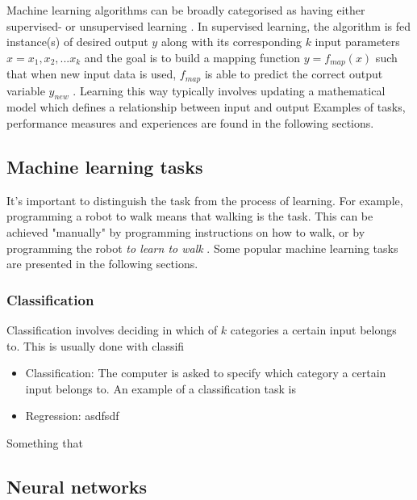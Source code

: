 
	Machine learning algorithms can be broadly categorised as having either supervised- or unsupervised learning \cite{BOOK:1}. In supervised learning, the algorithm is fed instance(s) of desired output $y$ along with its corresponding $k$ input parameters $x = {x_1, x_2, ... x_k}$ and the goal is to build a mapping function $y = f_{map}(x)$ such that when new input data is used, $f_{map}$ is able to predict the correct output variable $y_{new}$ \cite{WEBSITE:3}. Learning this way typically involves updating a mathematical model which defines a relationship between input and output
Examples of tasks, performance measures and experiences are found in the following sections.

\subsection{Machine learning tasks}
	It's important to distinguish the task from the process of learning. For example, programming a robot to walk means that walking is the task. This can be achieved "manually" by programming instructions on how to walk, or by programming the robot \emph{to learn to walk} \cite{BOOK:1}. Some popular machine learning tasks are presented in the following sections.

\subsubsection{Classification}
	Classification involves deciding in which of $k$ categories a certain input belongs to. This is usually done with classifi
	\begin{itemize}
		\item{Classification:} The computer is asked to specify which category a certain input belongs to. An example of a classification task is  
		\item{Regression:} asdfsdf
	\end{itemize} \cite{BOOK:1}
	Something that \cite{WEBSITE:1}
\subsection{Neural networks}

